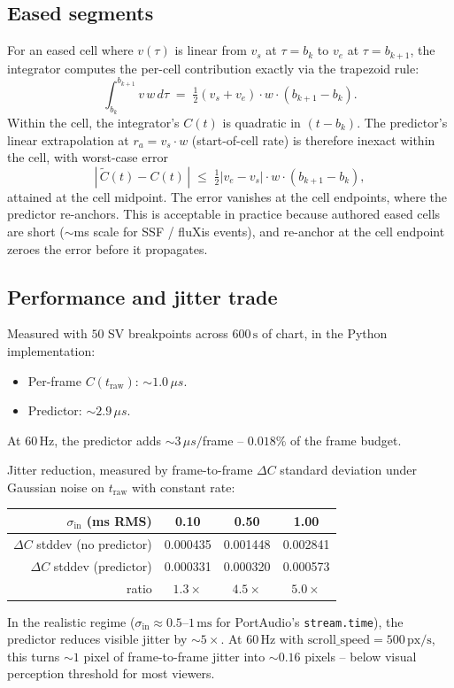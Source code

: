 \documentclass[11pt]{article}
\theoremstyle{definition}
\begin{document}
\subsection{Eased segments}

For an eased cell where $v(\tau)$ is linear from $v_s$ at $\tau = b_k$ to
$v_e$ at $\tau = b_{k+1}$, the integrator computes the per-cell
contribution exactly via the trapezoid rule:
\[
\int_{b_k}^{b_{k+1}} v\,w\,d\tau \;=\; \tfrac{1}{2}(v_s + v_e) \cdot w
\cdot (b_{k+1} - b_k).
\]
Within the cell, the integrator's $C(t)$ is quadratic in
$(t - b_k)$. The predictor's linear extrapolation at $r_a = v_s \cdot w$
(start-of-cell rate) is therefore inexact within the cell, with
worst-case error
\[
|\,\widetilde{C}(t) - C(t)\,| \;\leq\; \tfrac{1}{2}|v_e - v_s| \cdot w
\cdot (b_{k+1} - b_k),
\]
attained at the cell midpoint. The error vanishes at the cell endpoints,
where the predictor re-anchors. This is acceptable in practice because
authored eased cells are short ($\sim$ms scale for SSF / fluXis events),
and re-anchor at the cell endpoint zeroes the error before it propagates.

\subsection{Performance and jitter trade}

Measured with $50$ SV breakpoints across $600\,\mathrm{s}$ of chart, in
the Python implementation:
\begin{itemize}[leftmargin=2em]
    \item Per-frame $C(t_{\mathrm{raw}})$: $\sim 1.0\,\mu s$.
    \item Predictor: $\sim 2.9\,\mu s$.
\end{itemize}
At $60\,\mathrm{Hz}$, the predictor adds $\sim 3\,\mu s/$frame --
$0.018\%$ of the frame budget.

Jitter reduction, measured by frame-to-frame
$\Delta C$ standard deviation under Gaussian noise on $t_{\mathrm{raw}}$
with constant rate:
\begin{center}
\begin{tabular}{rccc}
\toprule
$\sigma_{\mathrm{in}}$ (ms RMS) & 0.10 & 0.50 & 1.00\\
\midrule
$\Delta C$ stddev (no predictor) & 0.000435 & 0.001448 & 0.002841\\
$\Delta C$ stddev (predictor) & 0.000331 & 0.000320 & 0.000573\\
ratio & $1.3\times$ & $4.5\times$ & $5.0\times$\\
\bottomrule
\end{tabular}
\end{center}
In the realistic regime ($\sigma_{\mathrm{in}} \approx 0.5$--$1\,\mathrm{ms}$
for PortAudio's \texttt{stream.time}), the predictor reduces visible
jitter by $\sim 5\times$. At $60\,\mathrm{Hz}$ with
$\mathrm{scroll\_speed} = 500\,\mathrm{px/s}$, this turns $\sim 1$ pixel
of frame-to-frame jitter into $\sim 0.16$ pixels -- below visual
perception threshold for most viewers.
\end{document}
